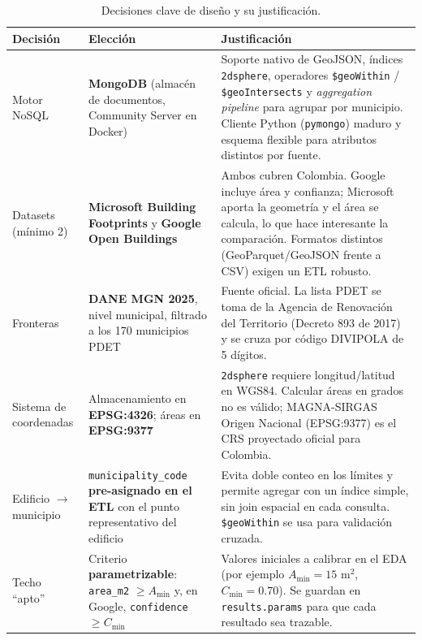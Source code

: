 \documentclass[11pt,letterpaper]{article}
\begin{document}
\begin{table}[!htbp]
\centering\small
\renewcommand{\arraystretch}{1.1}
\begin{tabular}{Y{0.17}Y{0.28}Y{0.55}}
\toprule
Decisión & Elección & Justificación \\
\midrule
Motor NoSQL
  & \textbf{MongoDB} (almacén de documentos, Community Server en Docker)
  & Soporte nativo de GeoJSON, índices \texttt{2dsphere}, operadores \texttt{\$geoWithin} /
    \texttt{\$geoIntersects} y \emph{aggregation pipeline} para agrupar por municipio. Cliente
    Python (\texttt{pymongo}) maduro y esquema flexible para atributos distintos por fuente. \\
\addlinespace[3pt]
Datasets (mínimo 2)
  & \textbf{Microsoft Building Footprints} y \textbf{Google Open Buildings}
  & Ambos cubren Colombia. Google incluye área y confianza; Microsoft aporta la geometría y el área
    se calcula, lo que hace interesante la comparación. Formatos distintos (GeoParquet/GeoJSON
    frente a CSV) exigen un ETL robusto. \\
\addlinespace[3pt]
Fronteras
  & \textbf{DANE MGN 2025}, nivel municipal, filtrado a los 170 municipios PDET
  & Fuente oficial. La lista PDET se toma de la Agencia de Renovación del Territorio (Decreto 893 de
    2017) y se cruza por código DIVIPOLA de 5 dígitos. \\
\addlinespace[3pt]
Sistema de coordenadas
  & Almacenamiento en \textbf{EPSG:4326}; áreas en \textbf{EPSG:9377}
  & \texttt{2dsphere} requiere longitud/latitud en WGS84. Calcular áreas en grados no es válido;
    MAGNA-SIRGAS Origen Nacional (EPSG:9377) es el CRS proyectado oficial para Colombia. \\
\addlinespace[3pt]
Edificio $\rightarrow$ municipio
  & \texttt{municipality\_code} \textbf{pre-asignado en el ETL} con el punto representativo del
    edificio
  & Evita doble conteo en los límites y permite agregar con un índice simple, sin join espacial en
    cada consulta. \texttt{\$geoWithin} se usa para validación cruzada. \\
\addlinespace[3pt]
Techo ``apto''
  & Criterio \textbf{parametrizable}: \texttt{area\_m2} $\geq A_{\min}$ y, en Google,
    \texttt{confidence} $\geq C_{\min}$
  & Valores iniciales a calibrar en el EDA (por ejemplo $A_{\min}=15$ m$^2$, $C_{\min}=0.70$). Se
    guardan en \texttt{results.params} para que cada resultado sea trazable. \\
\bottomrule
\end{tabular}
\caption{Decisiones clave de diseño y su justificación.}
\label{tab:decisiones}
\end{table}
\end{document}
